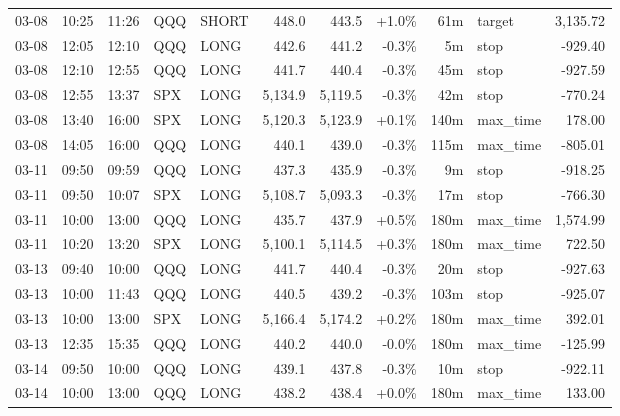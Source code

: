 \documentclass[11pt,a4paper,twoside]{article}
\begin{document}
\begin{center}
\begin{longtable}{>{\color{txtmain}}l l l l l r r r r >{\color{txtmain}}l r}
03-08 & 10:25 & 11:26 & QQQ & SHORT & 448.0 & 443.5 & \textcolor{wingreen}{+1.0\%} & 61m & target & \textcolor{wingreen}{3,135.72} \\
03-08 & 12:05 & 12:10 & QQQ & LONG & 442.6 & 441.2 & \textcolor{lossred}{-0.3\%} & 5m & stop & \textcolor{lossred}{-929.40} \\
03-08 & 12:10 & 12:55 & QQQ & LONG & 441.7 & 440.4 & \textcolor{lossred}{-0.3\%} & 45m & stop & \textcolor{lossred}{-927.59} \\
03-08 & 12:55 & 13:37 & SPX & LONG & 5,134.9 & 5,119.5 & \textcolor{lossred}{-0.3\%} & 42m & stop & \textcolor{lossred}{-770.24} \\
03-08 & 13:40 & 16:00 & SPX & LONG & 5,120.3 & 5,123.9 & \textcolor{wingreen}{+0.1\%} & 140m & max\_time & \textcolor{wingreen}{178.00} \\
03-08 & 14:05 & 16:00 & QQQ & LONG & 440.1 & 439.0 & \textcolor{lossred}{-0.3\%} & 115m & max\_time & \textcolor{lossred}{-805.01} \\
03-11 & 09:50 & 09:59 & QQQ & LONG & 437.3 & 435.9 & \textcolor{lossred}{-0.3\%} & 9m & stop & \textcolor{lossred}{-918.25} \\
03-11 & 09:50 & 10:07 & SPX & LONG & 5,108.7 & 5,093.3 & \textcolor{lossred}{-0.3\%} & 17m & stop & \textcolor{lossred}{-766.30} \\
03-11 & 10:00 & 13:00 & QQQ & LONG & 435.7 & 437.9 & \textcolor{wingreen}{+0.5\%} & 180m & max\_time & \textcolor{wingreen}{1,574.99} \\
03-11 & 10:20 & 13:20 & SPX & LONG & 5,100.1 & 5,114.5 & \textcolor{wingreen}{+0.3\%} & 180m & max\_time & \textcolor{wingreen}{722.50} \\
03-13 & 09:40 & 10:00 & QQQ & LONG & 441.7 & 440.4 & \textcolor{lossred}{-0.3\%} & 20m & stop & \textcolor{lossred}{-927.63} \\
03-13 & 10:00 & 11:43 & QQQ & LONG & 440.5 & 439.2 & \textcolor{lossred}{-0.3\%} & 103m & stop & \textcolor{lossred}{-925.07} \\
03-13 & 10:00 & 13:00 & SPX & LONG & 5,166.4 & 5,174.2 & \textcolor{wingreen}{+0.2\%} & 180m & max\_time & \textcolor{wingreen}{392.01} \\
03-13 & 12:35 & 15:35 & QQQ & LONG & 440.2 & 440.0 & \textcolor{lossred}{-0.0\%} & 180m & max\_time & \textcolor{lossred}{-125.99} \\
03-14 & 09:50 & 10:00 & QQQ & LONG & 439.1 & 437.8 & \textcolor{lossred}{-0.3\%} & 10m & stop & \textcolor{lossred}{-922.11} \\
03-14 & 10:00 & 13:00 & QQQ & LONG & 438.2 & 438.4 & \textcolor{wingreen}{+0.0\%} & 180m & max\_time & \textcolor{wingreen}{133.00} \\

\end{longtable}
\end{center}
\end{document}
